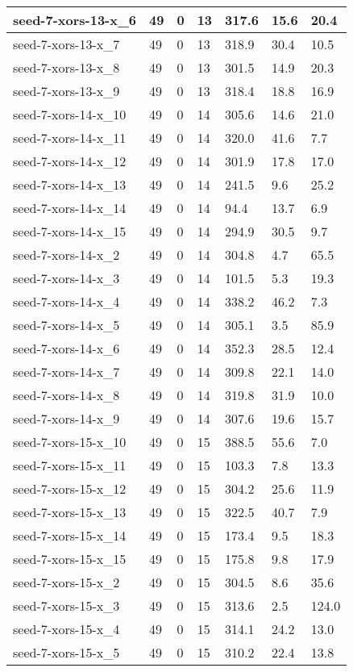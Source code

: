 \begin{scriptsize}
\begin{longtable}{|p{5cm}|l|l|l|l|l|l|}
seed-7-xors-13-x\_6&49&0&13&317.6&15.6&20.4 \\ \hline 
seed-7-xors-13-x\_7&49&0&13&318.9&30.4&10.5 \\ \hline 
seed-7-xors-13-x\_8&49&0&13&301.5&14.9&20.3 \\ \hline 
seed-7-xors-13-x\_9&49&0&13&318.4&18.8&16.9 \\ \hline 
seed-7-xors-14-x\_10&49&0&14&305.6&14.6&21.0 \\ \hline 
seed-7-xors-14-x\_11&49&0&14&320.0&41.6&7.7 \\ \hline 
seed-7-xors-14-x\_12&49&0&14&301.9&17.8&17.0 \\ \hline 
seed-7-xors-14-x\_13&49&0&14&241.5&9.6&25.2 \\ \hline 
seed-7-xors-14-x\_14&49&0&14&94.4&13.7&6.9 \\ \hline 
seed-7-xors-14-x\_15&49&0&14&294.9&30.5&9.7 \\ \hline 
seed-7-xors-14-x\_2&49&0&14&304.8&4.7&65.5 \\ \hline 
seed-7-xors-14-x\_3&49&0&14&101.5&5.3&19.3 \\ \hline 
seed-7-xors-14-x\_4&49&0&14&338.2&46.2&7.3 \\ \hline 
seed-7-xors-14-x\_5&49&0&14&305.1&3.5&85.9 \\ \hline 
seed-7-xors-14-x\_6&49&0&14&352.3&28.5&12.4 \\ \hline 
seed-7-xors-14-x\_7&49&0&14&309.8&22.1&14.0 \\ \hline 
seed-7-xors-14-x\_8&49&0&14&319.8&31.9&10.0 \\ \hline 
seed-7-xors-14-x\_9&49&0&14&307.6&19.6&15.7 \\ \hline 
seed-7-xors-15-x\_10&49&0&15&388.5&55.6&7.0 \\ \hline 
seed-7-xors-15-x\_11&49&0&15&103.3&7.8&13.3 \\ \hline 
seed-7-xors-15-x\_12&49&0&15&304.2&25.6&11.9 \\ \hline 
seed-7-xors-15-x\_13&49&0&15&322.5&40.7&7.9 \\ \hline 
seed-7-xors-15-x\_14&49&0&15&173.4&9.5&18.3 \\ \hline 
seed-7-xors-15-x\_15&49&0&15&175.8&9.8&17.9 \\ \hline 
seed-7-xors-15-x\_2&49&0&15&304.5&8.6&35.6 \\ \hline 
seed-7-xors-15-x\_3&49&0&15&313.6&2.5&124.0 \\ \hline 
seed-7-xors-15-x\_4&49&0&15&314.1&24.2&13.0 \\ \hline 
seed-7-xors-15-x\_5&49&0&15&310.2&22.4&13.8 \\ \hline 

\end{longtable}
\end{scriptsize}

